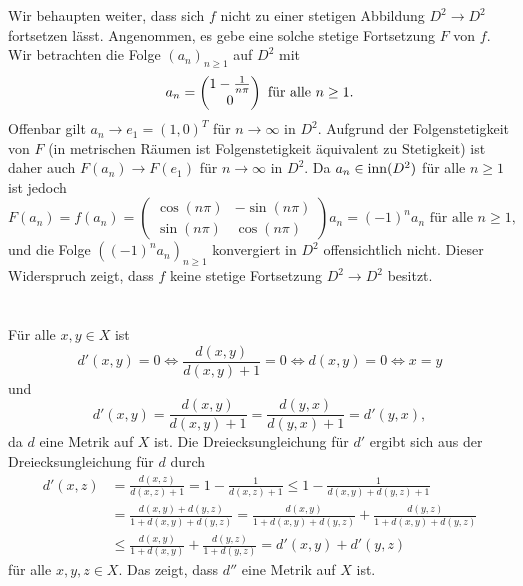 \documentclass[a4paper,10pt]{article}
\begin{document}
Wir behaupten weiter, dass sich $f$ nicht zu einer stetigen Abbildung $D^2 \to D^2$ fortsetzen lässt. Angenommen, es gebe eine solche stetige Fortsetzung $F$ von $f$. Wir betrachten die Folge $(a_n)_{n \geq 1}$ auf $D^2$ mit
\[
 a_n = \begin{pmatrix} 1-\frac{1}{n\pi} \\ 0\end{pmatrix} \text{ für alle } n \geq 1.
\]
Offenbar gilt $a_n \to e_1 = (1,0)^T$ für $n \to \infty$ in $D^2$. Aufgrund der Folgenstetigkeit von $F$ (in metrischen Räumen ist Folgenstetigkeit äquivalent zu Stetigkeit) ist daher auch $F(a_n) \to F(e_1)$ für $n \to \infty$ in $D^2$. Da $a_n \in \operatorname{inn}(D^2)$ für alle $n \geq 1$ ist jedoch
\[
 F(a_n) =
 f(a_n) =
 \begin{pmatrix}
  \cos\left(n\pi\right) & -\sin\left(n\pi\right) \\
  \sin\left(n\pi\right) &  \cos\left(n\pi\right)
 \end{pmatrix}
 a_n
 = (-1)^n a_n \text{ für alle } n \geq 1,
\]
und die Folge $((-1)^n a_n)_{n \geq 1}$ konvergiert in $D^2$ offensichtlich nicht. Dieser Widerspruch zeigt, dass $f$ keine stetige Fortsetzung $D^2 \to D^2$ besitzt.







\addtocounter{section}{2}





\section{}


\subsection{}
Für alle $x,y \in X$ ist
\[
 d'(x,y) = 0 \Leftrightarrow \frac{d(x,y)}{d(x,y)+1} = 0 \Leftrightarrow d(x,y) = 0 \Leftrightarrow x=y
\]
und
\[
 d'(x,y) = \frac{d(x,y)}{d(x,y)+1} = \frac{d(y,x)}{d(y,x)+1} = d'(y,x),
\]
da $d$ eine Metrik auf $X$ ist. Die Dreiecksungleichung für $d'$ ergibt sich aus der Dreiecksungleichung für $d$ durch
\begin{align*}
 d'(x,z)
 &= \frac{d(x,z)}{d(x,z)+1}
 = 1 - \frac{1}{d(x,z)+1}
 \leq 1 - \frac{1}{d(x,y)+d(y,z)+1} \\
 &= \frac{d(x,y)+d(y,z)}{1+d(x,y)+d(y,z)}
 = \frac{d(x,y)}{1+d(x,y)+d(y,z)} + \frac{d(y,z)}{1+d(x,y)+d(y,z)}\\
 &\leq \frac{d(x,y)}{1+d(x,y)} + \frac{d(y,z)}{1+d(y,z)}
 = d'(x,y) + d'(y,z)
\end{align*}
für alle $x,y,z \in X$. Das zeigt, dass $d''$ eine Metrik auf $X$ ist.
\end{document}
